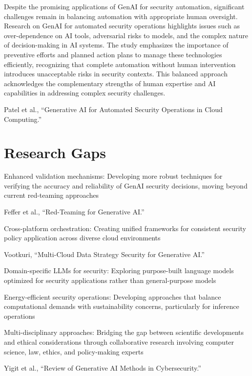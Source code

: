 Despite the promising applications of GenAI for security automation, significant challenges remain in balancing automation with appropriate human oversight. Research on GenAI for automated security operations highlights issues such as over-dependence on AI tools, adversarial risks to models, and the complex nature of decision-making in AI systems.
The study emphasizes the importance of preventive efforts and planned action plans to manage these technologies efficiently, recognizing that complete automation without human intervention introduces unacceptable risks in security contexts. This balanced approach acknowledges the complementary strengths of human expertise and AI capabilities in addressing complex security challenges.

Patel et al., “Generative AI for Automated Security Operations in Cloud Computing.”



\section{Research Gaps} %
\label{sec:Research Gaps}

Enhanced validation mechanisms: Developing more robust techniques for verifying the accuracy and reliability of GenAI security decisions, moving beyond current red-teaming approaches

Feffer et al., “Red-Teaming for Generative AI.”

Cross-platform orchestration: Creating unified frameworks for consistent security policy application across diverse cloud environments

Vootkuri, “Multi-Cloud Data Strategy Security for Generative AI.”

Domain-specific LLMs for security: Exploring purpose-built language models optimized for security applications rather than general-purpose models

Energy-efficient security operations: Developing approaches that balance computational demands with sustainability concerns, particularly for inference operations

Multi-disciplinary approaches: Bridging the gap between scientific developments and ethical considerations through collaborative research involving computer science, law, ethics, and policy-making experts

Yigit et al., “Review of Generative AI Methods in Cybersecurity.”

